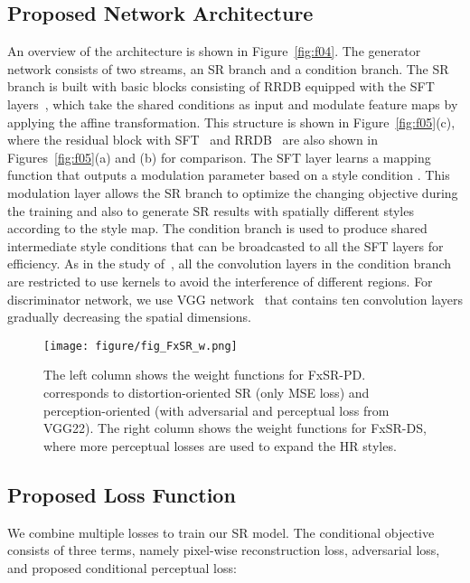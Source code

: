 \documentclass{article}
\begin{document}
\subsection{Proposed Network Architecture}
An overview of the architecture is shown in Figure~\ref{fig:f04}. The generator network  consists of two streams, an SR branch and a condition branch. The SR branch is built with basic blocks consisting of RRDB equipped with the SFT layers~\cite{2018recovering}, which take the shared conditions as input and modulate feature maps by applying the affine transformation. This structure is shown in Figure~\ref{fig:f05}(c), where the residual block with SFT~\cite{2018recovering} and RRDB~\cite{2018esrgan} are also shown in Figures~\ref{fig:f05}(a) and (b) for comparison. The SFT layer learns a mapping function that outputs a modulation parameter based on a style condition . This modulation layer allows the SR branch to optimize the changing objective during the training and also to generate SR results with spatially different styles according to the style map. The condition branch is used to produce shared intermediate style conditions that can be broadcasted to all the SFT layers for efficiency. As in the study of~\cite{2018recovering}, all the convolution layers in the condition branch are restricted to use  kernels to avoid the interference of different regions. For discriminator network, we use VGG network~\cite{SimonyanZ14a} that contains ten convolution layers gradually decreasing the spatial dimensions.
\begin{figure}[!t]
\centering
\begin{minipage}[t]{1.0\linewidth}
    \centering
    {\texttt{[image: figure/fig\_FxSR\_w.png]}}\vfill
\end{minipage}
\caption{The left column shows the weight functions for FxSR-PD.  corresponds to distortion-oriented SR (only MSE loss) and  perception-oriented (with adversarial and perceptual loss from VGG22). The right column shows the weight functions for FxSR-DS, where more perceptual losses are used to expand the HR styles.}
\label{fig:FxSR_w}
\end{figure}
\subsection{Proposed Loss Function}
We combine multiple losses to train our SR model. The conditional objective consists of three terms, namely pixel-wise reconstruction loss, adversarial loss, and proposed conditional perceptual loss:
\end{document}
